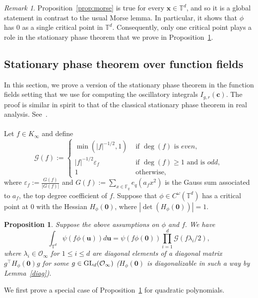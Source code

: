 \documentclass[10pt]{amsart}
\theoremstyle{plain}
\theoremstyle{plain}
\newtheorem{proposition}[theorem]{Proposition}
\renewcommand{\vec}[1]{\mathbf{#1}}
\theoremstyle{remark}
\newtheorem{remark}[equation]{Remark}
\theoremstyle{definition}
\newcommand{\GL}{\textup{GL}}
\newcommand{\TT}{\mathbb{T}}
\newcommand{\cO}{\mathcal{O}}
\newcommand{\cG}{\mathcal{G}}
\begin{document}
\begin{remark}Proposition~\ref{prop:morse} is true for every $\vec{x}\in\TT^d$, and so it is a global statement in contrast to the usual Morse lemma. In particular, it shows that $\phi$ has $0$ as a single critical point in $\TT^d$. Consequently, only one critical point plays a role in the stationary phase theorem that we prove in Proposition~\ref{station}.
\end{remark}
\subsection{Stationary phase theorem over function fields}
In this section, we prove a version  of the stationary phase theorem in the function fields setting that we use for computing the oscillatory integrals $I_{g,r}(\vec{c})$. The proof is similar in spirit to that of the classical stationary phase theorem in real analysis. See~\cite[Prop. 6, p. 344]{Stein}.\\
\\
Let $f\in K_{\infty}$ and define  
\begin{equation}\label{epsfact}
\cG(f):=\begin{cases}\min(|f|^{-1/2},1)   &\text{ if } \deg(f)\text{ is } even,
\\
|f|^{-1/2} \varepsilon_{f} &\text{ if } \deg(f)\geq 1\text{ and is } odd,
\\
1 &\text{ otherwise,}
\end{cases}
\end{equation}
where $\varepsilon_{f}:=\frac{G(f)}{|G(f)|}$ and  $G(f):=\sum_{x\in \mathbb{F}_q} e_q(a_f x^2)$ is the Gauss sum associated to $a_f$, the top degree coefficient of $f.$ Suppose that $\phi\in C^{\omega}(\TT^d)$ has a critical point at $0$ with the Hessian $H_{\phi}(\vec{0})$, where $|\det(H_{\phi}(\vec{0}))|=1.$
\begin{proposition}\label{station}
Suppose the above assumptions on $\phi$ and $f.$ We have
\[
\int_{\TT^d}\psi(f\phi(\vec{u}))d\vec{u}=\psi(f \phi(\vec{0})) \prod_{i=1}^{d}\cG (f\lambda_i/2),
\]
where $\lambda_i \in \cO_{\infty}$ for $1 \leq i\leq d$ are diagonal elements of a diagonal matrix $g^{\intercal}H_{\phi}(\vec{0})g$ for some $g\in \GL_d(\cO_{\infty})$ ($H_{\phi}(\vec{0})$ is diagonalizable in such a way by Lemma~\ref{diag}).
\end{proposition}
We first prove a special case of Proposition~\ref{station} for quadratic polynomials. 
\end{document}
